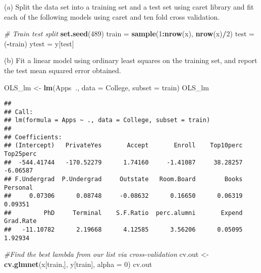 \documentclass[
  ignorenonframetext,
]{beamer}
\newenvironment{Shaded}{\begin{snugshade}}{\end{snugshade}}
\newcommand{\CommentTok}[1]{\textcolor[rgb]{0.56,0.35,0.01}{\textit{#1}}}
\newcommand{\DataTypeTok}[1]{\textcolor[rgb]{0.13,0.29,0.53}{#1}}
\newcommand{\DecValTok}[1]{\textcolor[rgb]{0.00,0.00,0.81}{#1}}
\newcommand{\KeywordTok}[1]{\textcolor[rgb]{0.13,0.29,0.53}{\textbf{#1}}}
\newcommand{\NormalTok}[1]{#1}
\newcommand{\OperatorTok}[1]{\textcolor[rgb]{0.81,0.36,0.00}{\textbf{#1}}}
\newcommand{\StringTok}[1]{\textcolor[rgb]{0.31,0.60,0.02}{#1}}
\begin{document}
\begin{frame}[fragile]{(a) Split the data set into a training set and a
test set using caret library and fit each of the following models using
caret and ten fold cross validation.}
\begin{Shaded}
\begin{Highlighting}[]
\CommentTok{# Train test split}
\KeywordTok{set.seed}\NormalTok{(}\DecValTok{489}\NormalTok{)}
\NormalTok{train =}\StringTok{ }\KeywordTok{sample}\NormalTok{(}\DecValTok{1}\OperatorTok{:}\KeywordTok{nrow}\NormalTok{(x), }\KeywordTok{nrow}\NormalTok{(x)}\OperatorTok{/}\DecValTok{2}\NormalTok{)}
\NormalTok{test =}\StringTok{ }\NormalTok{(}\OperatorTok{-}\NormalTok{train)}
\NormalTok{ytest =}\StringTok{ }\NormalTok{y[test]}
\end{Highlighting}
\end{Shaded}

\end{frame}

\begin{frame}[fragile]{(b) Fit a linear model using ordinary least
squares on the training set, and report the test mean squared error
obtained.}
\protect\hypertarget{b-fit-a-linear-model-using-ordinary-least-squares-on-the-training-set-and-report-the-test-mean-squared-error-obtained.}{}

\begin{Shaded}
\begin{Highlighting}[]
\NormalTok{OLS_lm <-}\StringTok{ }\KeywordTok{lm}\NormalTok{(Apps}\OperatorTok{~}\NormalTok{., }\DataTypeTok{data =}\NormalTok{ College, }\DataTypeTok{subset =}\NormalTok{ train)}
\NormalTok{OLS_lm}
\end{Highlighting}
\end{Shaded}

\begin{verbatim}
## 
## Call:
## lm(formula = Apps ~ ., data = College, subset = train)
## 
## Coefficients:
## (Intercept)   PrivateYes       Accept       Enroll    Top10perc    Top25perc  
##  -544.41744   -170.52279      1.74160     -1.41087     38.28257     -6.06587  
## F.Undergrad  P.Undergrad     Outstate   Room.Board        Books     Personal  
##     0.07306      0.08748     -0.08632      0.16650      0.06319      0.09351  
##         PhD     Terminal    S.F.Ratio  perc.alumni       Expend    Grad.Rate  
##   -11.10782      2.19668      4.12585      3.56206      0.05095      1.92934
\end{verbatim}

\begin{Shaded}
\begin{Highlighting}[]
\CommentTok{#Find the best lambda from our list via cross-validation}
\NormalTok{cv.out <-}\StringTok{ }\KeywordTok{cv.glmnet}\NormalTok{(x[train,], y[train], }\DataTypeTok{alpha =} \DecValTok{0}\NormalTok{)}
\NormalTok{cv.out}
\end{Highlighting}
\end{Shaded}


\end{frame}
\end{document}
